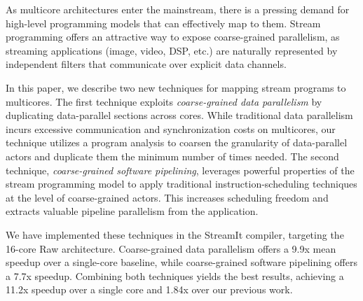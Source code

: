 As multicore architectures enter the mainstream, there is a pressing
demand for high-level programming models that can effectively map to
them.  Stream programming offers an attractive way to expose
coarse-grained parallelism, as streaming applications (image, video,
DSP, etc.) are naturally represented by independent filters that
communicate over explicit data channels.

In this paper, we describe two new techniques for mapping stream
programs to multicores.  The first technique exploits {\it
coarse-grained data parallelism} by duplicating data-parallel sections
across cores.  While traditional data parallelism incurs excessive
communication and synchronization costs on multicores, our technique
utilizes a program analysis to coarsen the granularity of
data-parallel actors and duplicate them the minimum number of times
needed.  The second technique, {\it coarse-grained software
pipelining}, leverages powerful properties of the stream programming
model to apply traditional instruction-scheduling techniques at the
level of coarse-grained actors.  This increases scheduling freedom and
extracts valuable pipeline parallelism from the application.

We have implemented these techniques in the StreamIt compiler,
targeting the 16-core Raw architecture.  Coarse-grained data
parallelism offers a 9.9x mean speedup over a single-core baseline,
while coarse-grained software pipelining offers a 7.7x speedup.
Combining both techniques yields the best results, achieving a 11.2x
speedup over a single core and 1.84x over our previous work.
